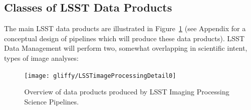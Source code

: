 \documentclass[SE,lsstdraft,toc]{lsstdoc}
\begin{document}
\subsection{Classes of LSST Data Products}

The main LSST data products are illustrated in Figure~\ref{fig:Detail0} (see Appendix for
a conceptual design of pipelines which will produce these data products).
LSST Data Management will perform two, somewhat overlapping in scientific intent, types of image analyses:

\begin{figure}[!t]
    \centering
    \vskip -0.7in
    \texttt{[image: gliffy/LSSTimageProcessingDetail0]}
    \vskip -0.7in
    \caption{Overview of data products produced by LSST Imaging Processing Science Pipelines.\label{fig:Detail0}}
\end{figure}
\end{document}
